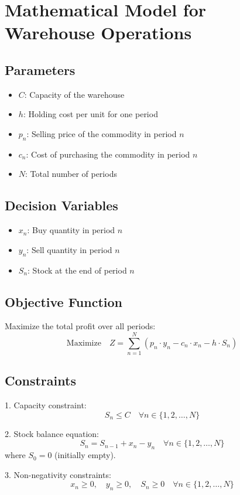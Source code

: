 \documentclass{article}
\begin{document}
\section*{Mathematical Model for Warehouse Operations}

\subsection*{Parameters}
\begin{itemize}
    \item \( C \): Capacity of the warehouse
    \item \( h \): Holding cost per unit for one period
    \item \( p_n \): Selling price of the commodity in period \( n \)
    \item \( c_n \): Cost of purchasing the commodity in period \( n \)
    \item \( N \): Total number of periods
\end{itemize}

\subsection*{Decision Variables}
\begin{itemize}
    \item \( x_n \): Buy quantity in period \( n \)
    \item \( y_n \): Sell quantity in period \( n \)
    \item \( S_n \): Stock at the end of period \( n \)
\end{itemize}

\subsection*{Objective Function}
Maximize the total profit over all periods:
\[
\text{Maximize} \quad Z = \sum_{n=1}^{N} (p_n \cdot y_n - c_n \cdot x_n - h \cdot S_n)
\]

\subsection*{Constraints}
1. Capacity constraint:
\[
S_n \leq C \quad \forall n \in \{1, 2, \ldots, N\}
\]

2. Stock balance equation:
\[
S_n = S_{n-1} + x_n - y_n \quad \forall n \in \{1, 2, \ldots, N\}
\]
where \( S_0 = 0 \) (initially empty).

3. Non-negativity constraints:
\[
x_n \geq 0, \quad y_n \geq 0, \quad S_n \geq 0 \quad \forall n \in \{1, 2, \ldots, N\}
\]
\end{document}
